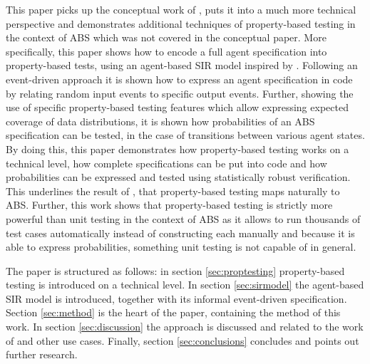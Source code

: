 This paper picks up the conceptual work of \cite{thaler_show_2019}, puts it into a much more technical perspective and demonstrates additional techniques of property-based testing in the context of ABS which was not covered in the conceptual paper. More specifically, this paper shows how to encode a full agent specification into property-based tests, using an agent-based SIR model inspired by \cite{macal_agent-based_2010}. Following an event-driven approach it is shown how to express an agent specification in code by relating random input events to specific output events. Further, showing the use of specific property-based testing features which allow expressing expected coverage of data distributions, it is shown how probabilities of an ABS specification can be tested, in the case of transitions between various agent states. By doing this, this paper demonstrates how property-based testing works on a technical level, how complete specifications can be put into code and how probabilities can be expressed and tested using statistically robust verification. This underlines the result of \cite{thaler_show_2019}, that property-based testing maps naturally to ABS. Further, this work shows that property-based testing is strictly more powerful than unit testing in the context of ABS as it allows to run thousands of test cases automatically instead of constructing each manually and because it is able to express probabilities, something unit testing is not capable of in general.

The paper is structured as follows: in section \ref{sec:proptesting} property-based testing is introduced on a technical level. In section \ref{sec:sirmodel} the agent-based SIR model is introduced, together with its informal event-driven specification. Section \ref{sec:method} is the heart of the paper, containing the method of this work. In section \ref{sec:discussion} the approach is discussed and related to the work of \cite{thaler_show_2019} and other use cases. Finally, section \ref{sec:conclusions} concludes and points out further research.